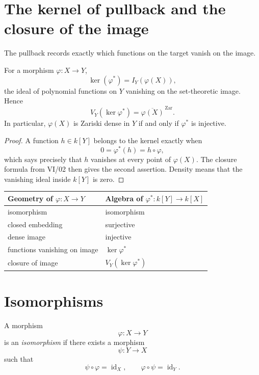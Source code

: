 \section{The kernel of pullback and the closure of the image}
\label{sec:vi04-image-kernel}

The pullback records exactly which functions on the target vanish on the image.

\begin{proposition}
\label{prop:vi04-kernel-image}
For a morphism \(\varphi:X\to Y\),
\[
\ker(\varphi^\ast)
=
I_Y(\varphi(X)),
\]
the ideal of polynomial functions on \(Y\) vanishing on the set-theoretic image.  Hence
\[
V_Y(\ker\varphi^\ast)=\overline{\varphi(X)}^{\,\mathrm{Zar}}.
\]
In particular, \(\varphi(X)\) is Zariski dense in \(Y\) if and only if \(\varphi^\ast\) is
injective.
\end{proposition}

\begin{proof}
A function \(h\in k[Y]\) belongs to the kernel exactly when
\[
0=\varphi^\ast(h)=h\circ\varphi,
\]
which says precisely that \(h\) vanishes at every point of \(\varphi(X)\).  The closure
formula from VI/02 then gives the second assertion.  Density means that the vanishing ideal
inside \(k[Y]\) is zero.
\end{proof}

\begin{center}
\begin{tabular}{@{}ll@{}}
\toprule
\textbf{Geometry of \(\varphi:X\to Y\)} & \textbf{Algebra of \(\varphi^\ast:k[Y]\to k[X]\)}\\
\midrule
isomorphism & isomorphism\\
closed embedding & surjective\\
dense image & injective\\
functions vanishing on image & \(\ker\varphi^\ast\)\\
closure of image & \(V_Y(\ker\varphi^\ast)\)\\
\bottomrule
\end{tabular}
\end{center}

\section{Isomorphisms}

\begin{definition}[Isomorphism]
A morphism
\[
\varphi:X\to Y
\]
is an \emph{isomorphism} if there exists a morphism
\[
\psi:Y\to X
\]
such that
\[
\psi\circ\varphi=\operatorname{id}_X,
\qquad
\varphi\circ\psi=\operatorname{id}_Y.
\]
\end{definition}

